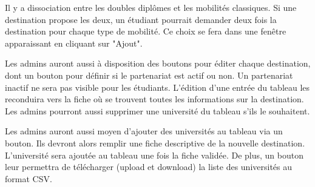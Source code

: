   Il y a dissociation entre les doubles diplômes et les mobilités classiques. Si une destination propose les deux, un étudiant pourrait demander deux fois la destination pour chaque type de mobilité. Ce choix se fera dans une fenêtre apparaissant en cliquant sur "Ajout". 
 
 Les admins auront aussi à disposition des boutons pour éditer chaque destination, dont un bouton pour définir si le partenariat est actif ou non. Un partenariat inactif ne sera pas visible pour les étudiants.
 L'édition d'une entrée du tableau les reconduira vers la fiche où se trouvent toutes les informations sur la destination.
 Les admins pourront aussi supprimer une université du tableau s'ils le souhaitent.
 
 Les admins auront aussi moyen d'ajouter des universités au tableau via un bouton. Ils devront alors remplir une fiche descriptive de la nouvelle destination. L'université sera ajoutée au tableau une fois la fiche validée. De plus, un bouton leur permettra de télécharger (upload et download) la liste des universités au format CSV.
 
